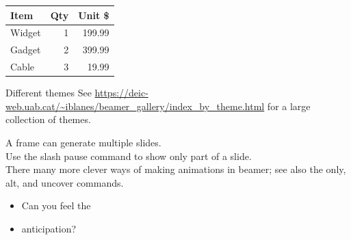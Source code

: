 \documentclass{beamer}
\begin{document}
\begin{frame}
\begin{center}
\begin{tabular}{|l|r|r|} \hline
Item & Qty & Unit \$ \\\hline
Widget & 1 & 199.99 \\
Gadget & 2 & 399.99 \\
Cable & 3 & 19.99 \\\hline
\end{tabular}
\end{center}
\end{frame}





\begin{frame}
\begin{block}{Different themes}
See \url{https://deic-web.uab.cat/~iblanes/beamer_gallery/index_by_theme.html}  for a large collection of themes.
\end{block}
\end{frame}


\begin{frame}
A frame can generate multiple slides.\\[6pt]
Use the slash pause command to show only part of a slide.\\[6pt]
There many more clever ways of making animations in beamer; see also the only, alt, and uncover commands.\\[6pt]
\end{frame}



\begin{frame}
\begin{itemize}
\item Can you feel the
\pause \item anticipation?
\end{itemize}
\end{frame}
\end{document}
